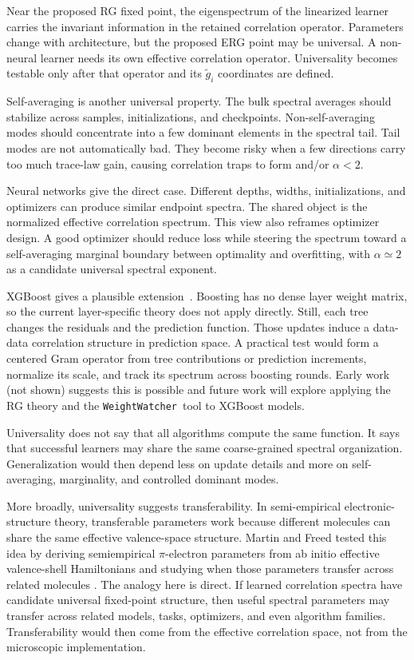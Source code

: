 \documentclass[10pt,twocolumn]{article}
\newcommand{\WW}{\texttt{WeightWatcher}}
\begin{document}
Near the proposed RG fixed point, the eigenspectrum of the linearized learner carries the invariant information in the retained correlation operator. Parameters change with architecture, but the proposed ERG point may be universal. A non-neural learner needs its own effective correlation operator. Universality becomes testable only after that operator and its $\widetilde g_i$ coordinates are defined.

Self-averaging is another universal property. The bulk spectral averages should stabilize across samples, initializations, and checkpoints.  Non-self-averaging modes should concentrate into a few dominant elements in the spectral tail.
Tail modes are not automatically bad. They become risky when a few directions carry too much trace-law gain,
causing correlation traps to form and/or $\alpha < 2$.

Neural networks give the direct case. Different depths, widths, initializations, and optimizers can produce similar endpoint spectra. The shared object is the normalized effective correlation spectrum. This view also reframes optimizer design. A good optimizer should reduce loss while steering the spectrum toward a self-averaging marginal boundary between
optimality and overfitting, with $\alpha\simeq 2$ as a candidate universal spectral exponent.

XGBoost gives a plausible extension~\cite{ChenGuestrin2016}. Boosting has no dense layer weight matrix, so the current layer-specific theory does not apply directly. Still, each tree changes the residuals and the prediction function. Those updates induce a data-data correlation structure in prediction space. A practical test would form a centered Gram operator from tree contributions or prediction increments, normalize its scale, and track its spectrum across boosting rounds.
Early work (not shown) suggests this is possible and future work will explore applying the RG theory and the \WW~tool to XGBoost models.

Universality does not say that all algorithms compute the same function. It says that successful learners may share the same coarse-grained spectral organization. Generalization would then depend less on update details and more on self-averaging, marginality, and controlled dominant modes.


More broadly, universality suggests transferability. In semi-empirical electronic-structure theory, transferable parameters work because different molecules can share the same effective valence-space structure. Martin and Freed tested this idea by deriving semiempirical $\pi$-electron parameters from ab initio effective valence-shell Hamiltonians and studying when those parameters transfer across related molecules \cite{MartinFreed1994I,Martin1996SchiffBases,Martin1996LargeSchiffBases}.
The analogy here is direct. If learned correlation spectra have candidate universal fixed-point structure, then useful spectral parameters may transfer across related models, tasks, optimizers, and even algorithm families. Transferability would then come from the effective correlation space, not from the microscopic implementation.
\end{document}

